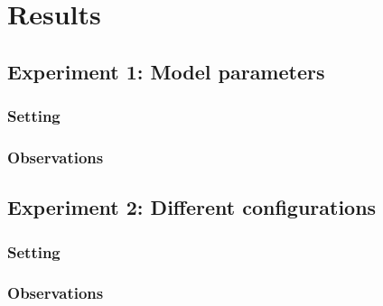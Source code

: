\documentclass[10pt]{article}
\begin{document}
\section{Results}

\subsection{Experiment 1: Model parameters}

\subsubsection{Setting}

\subsubsection{Observations}

\subsection{Experiment 2: Different configurations}

\subsubsection{Setting}

\subsubsection{Observations}
\end{document}
